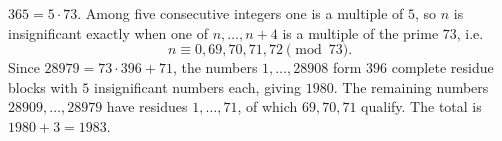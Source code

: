 $365=5\cdot73$. Among five consecutive integers one is a multiple of $5$, so $n$ is insignificant exactly when one of $n,\dots,n+4$ is a multiple of the prime $73$, i.e.
\[n\equiv0,69,70,71,72\pmod{73}.\]
Since $28979=73\cdot396+71$, the numbers $1,\dots,28908$ form $396$ complete residue blocks with $5$ insignificant numbers each, giving $1980$. The remaining numbers $28909,\dots,28979$ have residues $1,\dots,71$, of which $69,70,71$ qualify. The total is $1980+3=\boxed{1983}$.
